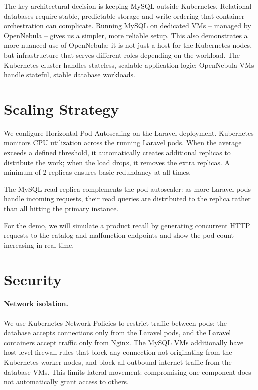 \documentclass[12pt,a4paper]{article}
\begin{document}
The key architectural decision is keeping MySQL outside Kubernetes. Relational databases require stable, predictable storage and write ordering that container orchestration can complicate. Running MySQL on dedicated VMs -- managed by OpenNebula -- gives us a simpler, more reliable setup. This also demonstrates a more nuanced use of OpenNebula: it is not just a host for the Kubernetes nodes, but infrastructure that serves different roles depending on the workload. The Kubernetes cluster handles stateless, scalable application logic; OpenNebula VMs handle stateful, stable database workloads.

\section{Scaling Strategy}

We configure Horizontal Pod Autoscaling on the Laravel deployment. Kubernetes monitors CPU utilization across the running Laravel pods. When the average exceeds a defined threshold, it automatically creates additional replicas to distribute the work; when the load drops, it removes the extra replicas. A minimum of 2 replicas ensures basic redundancy at all times.

The MySQL read replica complements the pod autoscaler: as more Laravel pods handle incoming requests, their read queries are distributed to the replica rather than all hitting the primary instance.

For the demo, we will simulate a product recall by generating concurrent HTTP requests to the catalog and malfunction endpoints and show the pod count increasing in real time.

\section{Security}

\paragraph{Network isolation.} We use Kubernetes Network Policies to restrict traffic between pods: the database accepts connections only from the Laravel pods, and the Laravel containers accept traffic only from Nginx. The MySQL VMs additionally have host-level firewall rules that block any connection not originating from the Kubernetes worker nodes, and block all outbound internet traffic from the database VMs. This limits lateral movement: compromising one component does not automatically grant access to others.
\end{document}
